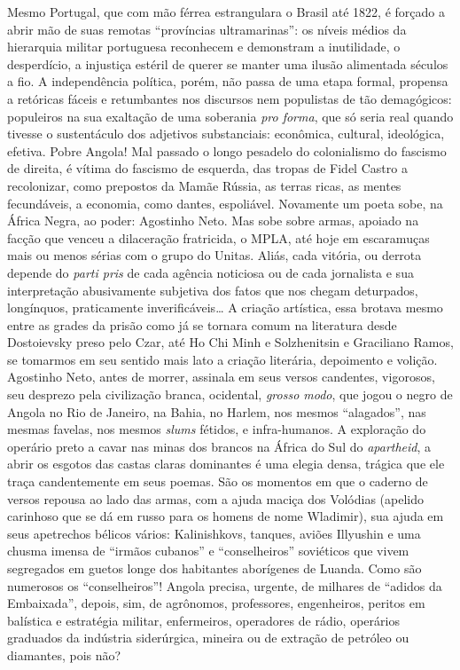 \documentclass[
  letterpaper,
  DIV=11,
  numbers=noendperiod]{scrreprt}
\begin{document}
Mesmo Portugal, que com mão férrea estrangulara o Brasil até 1822, é
forçado a abrir mão de suas remotas ``províncias ultramarinas'': os
níveis médios da hierarquia militar portuguesa reconhecem e demonstram a
inutilidade, o desperdício, a injustiça estéril de querer se manter uma
ilusão alimentada séculos a fio. A independência política, porém, não
passa de uma etapa formal, propensa a retóricas fáceis e retumbantes nos
discursos nem populistas de tão demagógicos: populeiros na sua exaltação
de uma soberania \emph{pro forma}, que só seria real quando tivesse o
sustentáculo dos adjetivos substanciais: econômica, cultural,
ideológica, efetiva. Pobre Angola! Mal passado o longo pesadelo do
colonialismo do fascismo de direita, é vítima do fascismo de esquerda,
das tropas de Fidel Castro a recolonizar, como prepostos da Mamãe
Rússia, as terras ricas, as mentes fecundáveis, a economia, como dantes,
espoliável. Novamente um poeta sobe, na África Negra, ao poder:
Agostinho Neto. Mas sobe sobre armas, apoiado na facção que venceu a
dilaceração fratricida, o MPLA, até hoje em escaramuças mais ou menos
sérias com o grupo do Unitas. Aliás, cada vitória, ou derrota depende do
\emph{parti pris} de cada agência noticiosa ou de cada jornalista e sua
interpretação abusivamente subjetiva dos fatos que nos chegam
deturpados, longínquos, praticamente inverificáveis\ldots{} A criação
artística, essa brotava mesmo entre as grades da prisão como já se
tornara comum na literatura desde Dostoievsky preso pelo Czar, até Ho
Chi Minh e Solzhenitsin e Graciliano Ramos, se tomarmos em seu sentido
mais lato a criação literária, depoimento e volição. Agostinho Neto,
antes de morrer, assinala em seus versos candentes, vigorosos, seu
desprezo pela civilização branca, ocidental, \emph{grosso modo}, que
jogou o negro de Angola no Rio de Janeiro, na Bahia, no Harlem, nos
mesmos ``alagados'', nas mesmas favelas, nos mesmos \emph{slums}
fétidos, e infra-humanos. A exploração do operário preto a cavar nas
minas dos brancos na África do Sul do \emph{apartheid}, a abrir os
esgotos das castas claras dominantes é uma elegia densa, trágica que ele
traça candentemente em seus poemas. São os momentos em que o caderno de
versos repousa ao lado das armas, com a ajuda maciça dos Volódias
(apelido carinhoso que se dá em russo para os homens de nome Wladimir),
sua ajuda em seus apetrechos bélicos vários: Kalinishkovs, tanques,
aviões Illyushin e uma chusma imensa de ``irmãos cubanos'' e
``conselheiros'' soviéticos que vivem segregados em guetos longe dos
habitantes aborígenes de Luanda. Como são numerosos os ``conselheiros''!
Angola precisa, urgente, de milhares de ``adidos da Embaixada'', depois,
sim, de agrônomos, professores, engenheiros, peritos em balística e
estratégia militar, enfermeiros, operadores de rádio, operários
graduados da indústria siderúrgica, mineira ou de extração de petróleo
ou diamantes, pois não?
\end{document}
